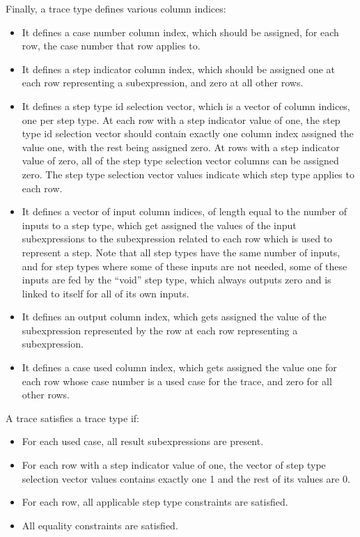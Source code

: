 \documentclass[11pt]{article}
\begin{document}
Finally, a trace type defines various column indices:
\begin{itemize}
	\item It defines a case number column index, which should be assigned, for each row, the case number that row applies to.
	\item It defines a step indicator column index, which should be assigned one at each row representing a subexpression, and zero at all other rows.
	\item It defines a step type id selection vector, which is a vector of column indices, one per step type. At each row with a step indicator value of one, the step type id selection vector should contain exactly one column index assigned the value one, with the rest being assigned zero. At rows with a step indicator value of zero, all of the step type selection vector columns can be assigned zero. The step type selection vector values indicate which step type applies to each row. 
	\item It defines a vector of input column indices, of length equal to the number of inputs to a step type, which get assigned the values of the input subexpressions to the subexpression related to each row which is used to represent a step. Note that all step types have the same number of inputs, and for step types where some of these inputs are not needed, some of these inputs are fed by the ``void'' step type, which always outputs zero and is linked to itself for all of its own inputs.
	\item It defines an output column index, which gets assigned the value of the subexpression represented by the row at each row representing a subexpression.
	\item It defines a case used column index, which gets assigned the value one for each row whose case number is a used case for the trace, and zero for all other rows.
\end{itemize}

A trace satisfies a trace type if:
\begin{itemize}
	\item For each used case, all result subexpressions are present.
	\item For each row with a step indicator value of one, the vector of step type selection vector values contains exactly one 1 and the rest of its values are 0.
	\item For each row, all applicable step type constraints are satisfied.
	\item All equality constraints are satisfied.
\end{itemize}
\end{document}
